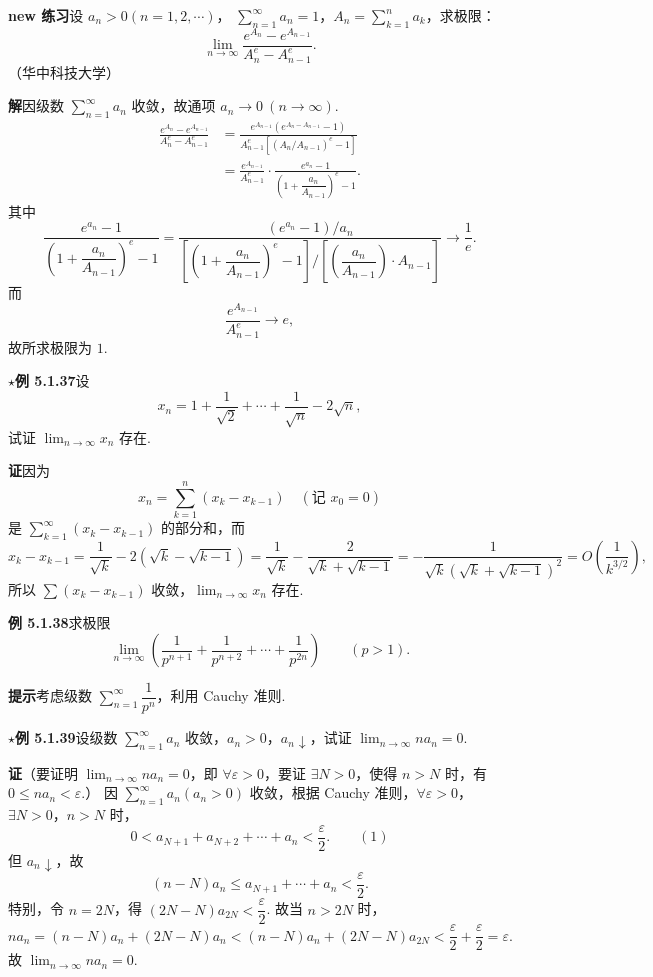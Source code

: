 \documentclass[UTF8,12pt,a4paper,fontset=fandol]{ctexart}
\begin{document}
\noindent\textbf{new 练习}\quad 设 $a_n>0(n=1,2,\cdots)$，
$\displaystyle\sum_{n=1}^{\infty}a_n=1$，$A_n=\displaystyle\sum_{k=1}^n a_k$，求极限：
\[
  \lim_{n\to\infty}\frac{e^{A_n}-e^{A_{n-1}}}{A_n^e-A_{n-1}^e}.
\]
（华中科技大学）

\noindent\textbf{解}\quad 因级数 $\displaystyle\sum_{n=1}^{\infty}a_n$ 收敛，故通项 $a_n\to0\ (n\to\infty)$.
\[
\begin{aligned}
  \frac{e^{A_n}-e^{A_{n-1}}}{A_n^e-A_{n-1}^e}
  &=\frac{e^{A_{n-1}}(e^{A_n-A_{n-1}}-1)}
          {A_{n-1}^e\left[\left(A_n/A_{n-1}\right)^e-1\right]}\\
  &=\frac{e^{A_{n-1}}}{A_{n-1}^e}\cdot
    \frac{e^{a_n}-1}{\left(1+\dfrac{a_n}{A_{n-1}}\right)^e-1}.
\end{aligned}
\]
其中
\[
  \frac{e^{a_n}-1}{\left(1+\dfrac{a_n}{A_{n-1}}\right)^e-1}
  =
  \frac{(e^{a_n}-1)/a_n}
       {\left[\left(1+\dfrac{a_n}{A_{n-1}}\right)^e-1\right]/
        \left[\left(\dfrac{a_n}{A_{n-1}}\right)\cdot A_{n-1}\right]}
  \to\frac1e.
\]
而
\[
  \frac{e^{A_{n-1}}}{A_{n-1}^e}\to e,
\]
故所求极限为 $1$.

\noindent\textbf{$\star$例 5.1.37}\quad 设
\[
  x_n=1+\frac1{\sqrt2}+\cdots+\frac1{\sqrt n}-2\sqrt n,
\]
试证 $\displaystyle\lim_{n\to\infty}x_n$ 存在.

\noindent\textbf{证}\quad 因为
\[
  x_n=\sum_{k=1}^n(x_k-x_{k-1})\quad(\text{记 }x_0=0)
\]
是 $\displaystyle\sum_{k=1}^{\infty}(x_k-x_{k-1})$ 的部分和，而
\[
  x_k-x_{k-1}=\frac1{\sqrt k}-2(\sqrt k-\sqrt{k-1})
  =\frac1{\sqrt k}-\frac2{\sqrt k+\sqrt{k-1}}
  =-\frac1{\sqrt k(\sqrt k+\sqrt{k-1})^2}
  =O\left(\frac1{k^{3/2}}\right),
\]
所以 $\displaystyle\sum(x_k-x_{k-1})$ 收敛，$\displaystyle\lim_{n\to\infty}x_n$ 存在.

\noindent\textbf{例 5.1.38}\quad 求极限
\[
  \lim_{n\to\infty}\left(\frac1{p^{n+1}}+\frac1{p^{n+2}}+\cdots+\frac1{p^{2n}}\right)
  \qquad(p>1).
\]

\noindent\textbf{提示}\quad 考虑级数 $\displaystyle\sum_{n=1}^{\infty}\dfrac1{p^n}$，利用 Cauchy 准则.

\noindent\textbf{$\star$例 5.1.39}\quad 设级数 $\displaystyle\sum_{n=1}^{\infty}a_n$ 收敛，$a_n>0$，$a_n\downarrow$，试证
$\displaystyle\lim_{n\to\infty}na_n=0$.

\noindent\textbf{证}\quad （要证明 $\lim_{n\to\infty}na_n=0$，即 $\forall\varepsilon>0$，要证 $\exists N>0$，使得 $n>N$ 时，有 $0\le na_n<\varepsilon$.）
因 $\displaystyle\sum_{n=1}^{\infty}a_n(a_n>0)$ 收敛，根据 Cauchy 准则，$\forall\varepsilon>0$，$\exists N>0$，$n>N$ 时，
\[
  0<a_{N+1}+a_{N+2}+\cdots+a_n<\frac{\varepsilon}{2}.
\qquad(1)
\]
但 $a_n\downarrow$，故
\[
  (n-N)a_n\le a_{N+1}+\cdots+a_n<\frac{\varepsilon}{2}.
\]
特别，令 $n=2N$，得 $(2N-N)a_{2N}<\dfrac{\varepsilon}{2}$. 故当 $n>2N$ 时，
\[
  na_n=(n-N)a_n+(2N-N)a_n
  <(n-N)a_n+(2N-N)a_{2N}<\frac{\varepsilon}{2}+\frac{\varepsilon}{2}
  =\varepsilon.
\]
故 $\displaystyle\lim_{n\to\infty}na_n=0$.
\end{document}
